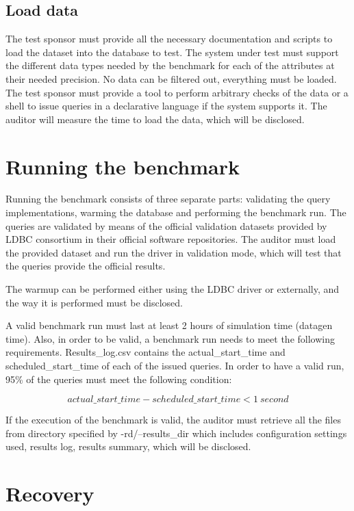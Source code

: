 \subsection{Load data}

The test sponsor must provide all the necessary documentation and scripts
to load the dataset into the database to test. The system under test must
support the different data types needed by the benchmark for each of the
attributes at their needed precision. No data can be filtered out, everything
must be loaded.  The test sponsor must provide a tool to perform arbitrary
checks of the data or a shell to issue queries in a declarative language if the
system supports it. The auditor will measure the time to load the data, which
will be disclosed.

\section{Running the benchmark}

Running the benchmark consists of three separate parts: validating the query
implementations, warming the database and performing the benchmark run. The
queries are validated by means of the official validation datasets provided by
LDBC consortium in their official software repositories. The auditor must load
the provided dataset and run the driver in validation mode, which will test
that the queries provide the official results.


The warmup can be performed either using the LDBC driver or externally, and the
way it is performed must be disclosed.

A valid benchmark run must last at least 2 hours of simulation time (datagen
time).  Also, in order to be valid, a benchmark run needs to meet the following
requirements.  Results\_log.csv contains the actual\_start\_time and
scheduled\_start\_time of each of the issued queries.  In order to have a valid
run, 95\% of the queries must meet the following condition: 

\begin{equation*}
actual\_start\_time - scheduled\_start\_time < 1 \ second
\end{equation*}

If the execution of the benchmark is valid, the auditor must retrieve all the
files from directory specified by -rd/--results\_dir which includes
configuration settings used, results log, results summary, which will be
disclosed.

\section{Recovery}

